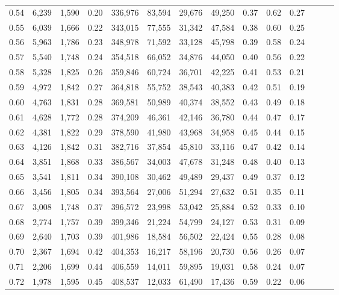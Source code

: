 \begin{tabular}{rrrrrrrrrrrrrr}
0.54 &  6,239 &  1,590 &  0.20 &  336,976 &   83,594 &  29,676 &  49,250 &  0.37 &  0.62 &      0.27 \\
0.55 &  6,039 &  1,666 &  0.22 &  343,015 &   77,555 &  31,342 &  47,584 &  0.38 &  0.60 &      0.25 \\
0.56 &  5,963 &  1,786 &  0.23 &  348,978 &   71,592 &  33,128 &  45,798 &  0.39 &  0.58 &      0.24 \\
0.57 &  5,540 &  1,748 &  0.24 &  354,518 &   66,052 &  34,876 &  44,050 &  0.40 &  0.56 &      0.22 \\
0.58 &  5,328 &  1,825 &  0.26 &  359,846 &   60,724 &  36,701 &  42,225 &  0.41 &  0.53 &      0.21 \\
0.59 &  4,972 &  1,842 &  0.27 &  364,818 &   55,752 &  38,543 &  40,383 &  0.42 &  0.51 &      0.19 \\
0.60 &  4,763 &  1,831 &  0.28 &  369,581 &   50,989 &  40,374 &  38,552 &  0.43 &  0.49 &      0.18 \\
0.61 &  4,628 &  1,772 &  0.28 &  374,209 &   46,361 &  42,146 &  36,780 &  0.44 &  0.47 &      0.17 \\
0.62 &  4,381 &  1,822 &  0.29 &  378,590 &   41,980 &  43,968 &  34,958 &  0.45 &  0.44 &      0.15 \\
0.63 &  4,126 &  1,842 &  0.31 &  382,716 &   37,854 &  45,810 &  33,116 &  0.47 &  0.42 &      0.14 \\
0.64 &  3,851 &  1,868 &  0.33 &  386,567 &   34,003 &  47,678 &  31,248 &  0.48 &  0.40 &      0.13 \\
0.65 &  3,541 &  1,811 &  0.34 &  390,108 &   30,462 &  49,489 &  29,437 &  0.49 &  0.37 &      0.12 \\
0.66 &  3,456 &  1,805 &  0.34 &  393,564 &   27,006 &  51,294 &  27,632 &  0.51 &  0.35 &      0.11 \\
0.67 &  3,008 &  1,748 &  0.37 &  396,572 &   23,998 &  53,042 &  25,884 &  0.52 &  0.33 &      0.10 \\
0.68 &  2,774 &  1,757 &  0.39 &  399,346 &   21,224 &  54,799 &  24,127 &  0.53 &  0.31 &      0.09 \\
0.69 &  2,640 &  1,703 &  0.39 &  401,986 &   18,584 &  56,502 &  22,424 &  0.55 &  0.28 &      0.08 \\
0.70 &  2,367 &  1,694 &  0.42 &  404,353 &   16,217 &  58,196 &  20,730 &  0.56 &  0.26 &      0.07 \\
0.71 &  2,206 &  1,699 &  0.44 &  406,559 &   14,011 &  59,895 &  19,031 &  0.58 &  0.24 &      0.07 \\
0.72 &  1,978 &  1,595 &  0.45 &  408,537 &   12,033 &  61,490 &  17,436 &  0.59 &  0.22 &      0.06 \\

\end{tabular}
